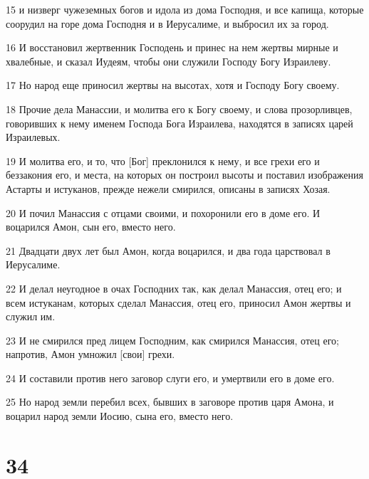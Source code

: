 \par 15 и низверг чужеземных богов и идола из дома Господня, и все капища, которые соорудил на горе дома Господня и в Иерусалиме, и выбросил их за город.
\par 16 И восстановил жертвенник Господень и принес на нем жертвы мирные и хвалебные, и сказал Иудеям, чтобы они служили Господу Богу Израилеву.
\par 17 Но народ еще приносил жертвы на высотах, хотя и Господу Богу своему.
\par 18 Прочие дела Манассии, и молитва его к Богу своему, и слова прозорливцев, говоривших к нему именем Господа Бога Израилева, находятся в записях царей Израилевых.
\par 19 И молитва его, и то, что [Бог] преклонился к нему, и все грехи его и беззакония его, и места, на которых он построил высоты и поставил изображения Астарты и истуканов, прежде нежели смирился, описаны в записях Хозая.
\par 20 И почил Манассия с отцами своими, и похоронили его в доме его. И воцарился Амон, сын его, вместо него.
\par 21 Двадцати двух лет был Амон, когда воцарился, и два года царствовал в Иерусалиме.
\par 22 И делал неугодное в очах Господних так, как делал Манассия, отец его; и всем истуканам, которых сделал Манассия, отец его, приносил Амон жертвы и служил им.
\par 23 И не смирился пред лицем Господним, как смирился Манассия, отец его; напротив, Амон умножил [свои] грехи.
\par 24 И составили против него заговор слуги его, и умертвили его в доме его.
\par 25 Но народ земли перебил всех, бывших в заговоре против царя Амона, и воцарил народ земли Иосию, сына его, вместо него.

\chapter{34}

